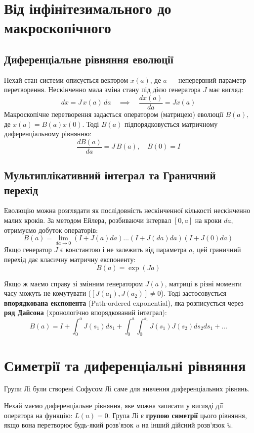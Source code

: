 \documentclass[12pt, a4paper]{article}
\begin{document}
	\section{Від інфінітезимального до макроскопічного}
	
	\subsection{Диференціальне рівняння еволюції}
	Нехай стан системи описується вектором $x(a)$, де $a$ — неперервний параметр перетворення. Нескінченно мала зміна стану під дією генератора $J$ має вигляд:
	\[ dx = J \, x(a) \, da \quad \implies \quad \frac{dx(a)}{da} = J x(a) \]
	Макроскопічне перетворення задається оператором (матрицею) еволюції $B(a)$, де $x(a) = B(a)x(0)$. Тоді $B(a)$ підпорядковується матричному диференціальному рівнянню:
	\[ \frac{dB(a)}{da} = J \, B(a), \quad B(0) = I \]
	
	\subsection{Мультиплікативний інтеграл та Граничний перехід}
	Еволюцію можна розглядати як послідовність нескінченної кількості нескінченно малих кроків. За методом Ейлера, розбиваючи інтервал $[0, a]$ на кроки $da$, отримуємо добуток операторів:
	\[ B(a) = \lim_{da \to 0} (I + J(a) da) \dots (I + J(da) da) (I + J(0) da) \]
	Якщо генератор $J$ є константою і не залежить від параметра $a$, цей граничний перехід дає класичну матричну експоненту:
	\[ B(a) = \exp(J a) \]
	
	Якщо ж маємо справу зі змінним генератором $J(a)$, матриці в різні моменти часу можуть не комутувати ($[J(a_1), J(a_2)] \neq 0$). Тоді застосовується \textbf{впорядкована експонента} (Path-ordered exponential), яка розписується через \textbf{ряд Дайсона} (хронологічно впорядкований інтеграл):
	\[ B(a) = I + \int_{0}^{a} J(s_1) ds_1 + \int_{0}^{a} \int_{0}^{s_1} J(s_1) J(s_2) ds_2 ds_1 + \dots \]
	
	\section{Симетрії та диференціальні рівняння}
	
	Групи Лі були створені Софусом Лі саме для вивчення диференціальних рівнянь. 
	
	Нехай маємо диференціальне рівняння, яке можна записати у вигляді дії оператора на функцію: $L(u) = 0$. 
	Група Лі є \textbf{групою симетрії} цього рівняння, якщо вона перетворює будь-який розв'язок $u$ на інший дійсний розв'язок $\tilde{u}$.
	
\end{document}
